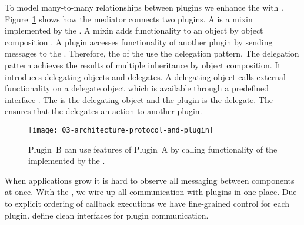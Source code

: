 \documentclass[../../ClassicThesis.tex]{subfiles}
\begin{document}
To model many-to-many relationships between plugins we
enhance the  with .
Figure~\ref{fig:protocol-and-plugin} shows how the mediator
connects two plugins. A  is a mixin
implemented by the . A mixin adds
functionality to an object by object
composition \cite[p.~81]{js-design-patterns}.
A plugin accesses functionality of another plugin by sending
messages to the . Therefore, the
 of the  use the
delegation pattern.
The delegation pattern achieves the results of multiple
inheritance by object composition. It introduces delegating
objects and delegates. A delegating object calls external
functionality on a delegate object which is available
through a predefined interface \cite{delegation-pattern}.
The  is the delegating object and the
plugin is the delegate.
The  ensures that the 
delegates an action to another plugin.

\begin{figure}[h]
  \centering
  \texttt{[image: 03-architecture-protocol-and-plugin]}
  \caption{Plugin~B can use features of Plugin~A by calling functionality of the  implemented by the .}
  \label{fig:protocol-and-plugin}
\end{figure}

When applications grow it is hard to observe all messaging
between components at once. With the , we
wire up all communication with plugins in one place. Due to
explicit ordering of callback executions we have
fine-grained control for each plugin. 
define clean interfaces for plugin communication.

\end{document}

